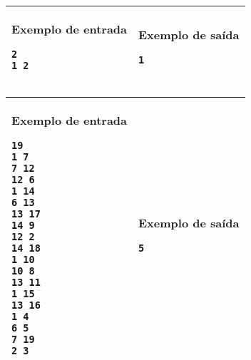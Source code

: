 \begin{table}[!h]
\centering
\begin{tabular}{|l|l|}
\hline
\begin{minipage}[t]{3in}
\textbf{Exemplo de entrada}
\begin{verbatim}
2
1 2
\end{verbatim}
\vspace{1mm}
\end{minipage}
&
\begin{minipage}[t]{3in}
\textbf{Exemplo de saída}
\begin{verbatim}
1
\end{verbatim}
\vspace{1mm}
\end{minipage} \\
\hline
\end{tabular}
\end{table}

\begin{table}[!h]
\centering
\begin{tabular}{|l|l|}
\hline
\begin{minipage}[t]{3in}
\textbf{Exemplo de entrada}
\begin{verbatim}
19
1 7
7 12
12 6
1 14
6 13
13 17
14 9
12 2
14 18
1 10
10 8
13 11
1 15
13 16
1 4
6 5
7 19
2 3
\end{verbatim}
\vspace{1mm}
\end{minipage}
&
\begin{minipage}[t]{3in}
\textbf{Exemplo de saída}
\begin{verbatim}
5
\end{verbatim}
\vspace{1mm}
\end{minipage} \\
\hline
\end{tabular}
\end{table}
